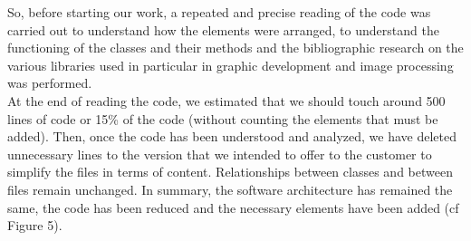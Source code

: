 \documentclass[a4paper,12pt]{report}
\begin{document}
So, before starting our work, a repeated and precise reading of the code was carried out to understand how the elements were arranged, to understand the functioning of the classes and their methods and the bibliographic research on the various libraries used in particular in graphic development and image processing was performed. \\

At the end of reading the code, we estimated that we should touch around 500 lines of code or 15\% of the code (without counting the elements that must be added). Then, once the code has been understood and analyzed, we have deleted unnecessary lines to the version that we intended to offer to the customer to simplify the files in terms of content. Relationships between classes and between files remain unchanged. In summary, the software architecture has remained the same, the code has been reduced and the necessary elements have been added (cf Figure 5).\\ 
\end{document}

